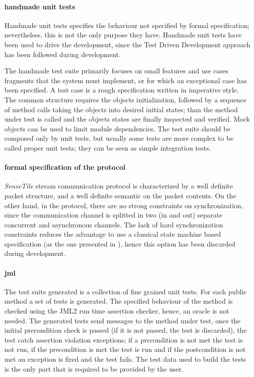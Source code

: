 \documentclass[english]{lni}
\newcommand{\ST}{\emph{SenseTile}\xspace}
\begin{document}
\paragraph*{handmade unit tests}

Handmade unit tests specifies the behaviour not specified by formal specification; nevertheless, this is not the only purpose they have.
Handmade unit tests have been used to drive the development, since the Test Driven Development approach\cite{Beck2003} has been
followed during development.

The handmade test suite primarily focuses on small features and use cases fragments that the system must implement, or for which an exceptional case has been specified. 
A test case is a rough specification written in imperative style. 
The common structure requires the objects initialization, followed by a sequence of method calls taking the objects into desired initial states; than the method under test is called and the objects states are finally inspected and verified. 
Mock objects can be used to limit module dependencies. 
The test suite should be composed only by unit tests, but usually some tests are more complex to be called proper unit tests; they can be seen as simple integration tests.


\paragraph*{formal specification of the protocol}

\ST stream communication protocol is characterized by a well definite packet structure, and a well definite semantic on the packet contents.  
On the other hand, in the protocol, there are no strong constraints on synchronization, since the communication channel is splitted in two (in and out) separate concurrent and asynchronous channels.
The lack of hard synchronization constraints reduces the advantage to use a classical state machine based specification (as the one presented in \cite{Hubbers2004}), hence this option has been discarded during development.

\paragraph{jml}

The test suite generated is a collection of fine grained unit tests.
For each public method a set of tests is generated.
The specified behaviour of the method is checked using the JML2 run time assertion checker, hence, an oracle is not needed.  
The generated tests send messages to the method under test, once the initial precondition check is passed (if it is not passed, the test is discarded), the test catch assertion violation exceptions; if a precondition is not met the test is not run, if the precondition is met the test is run and if the postcondition is not met an exception is fired and the test fails.
The test data used to build the tests is the only part that is required to be provided by the user.
\end{document}
